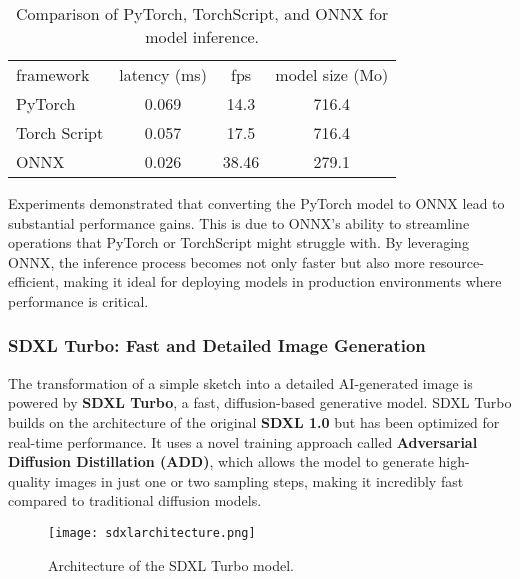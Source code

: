 \begin{table}[h]
    \footnotesize%
    \begin{center}
      \begin{tabular}{lccc}
        \toprule
        framework    & latency (ms) & fps   & model size (Mo) \\
        PyTorch      & 0.069        & 14.3  & 716.4           \\
        Torch Script & 0.057        & 17.5  & 716.4           \\
        ONNX         & 0.026        & 38.46 & 279.1           \\
        \bottomrule
      \end{tabular}
    \end{center}
    \caption{Comparison of PyTorch, TorchScript, and ONNX for model inference.}
    \label{tab:frameworks}
  \end{table}


Experiments demonstrated that converting the PyTorch model to ONNX lead to substantial performance gains.
This is due to ONNX's ability to streamline operations that PyTorch or TorchScript might struggle with.
By leveraging ONNX, the inference process becomes not only faster but also more resource-efficient, making it ideal for deploying models in production environments where performance is critical.

\subsubsection{ SDXL Turbo: Fast and Detailed Image Generation}

The transformation of a simple sketch into a detailed AI-generated image is powered by \textbf{SDXL Turbo}, a fast, diffusion-based generative model.
SDXL Turbo builds on the architecture of the original \textbf{SDXL 1.0} but has been optimized for real-time performance.
It uses a novel training approach called \textbf{Adversarial Diffusion Distillation (ADD)}, which allows the model to generate high-quality images in just one or two sampling steps, making it incredibly fast compared to traditional diffusion models.

\begin{figure}[h]
    \centering
    \texttt{[image: sdxlarchitecture.png]}
    \caption{Architecture of the SDXL Turbo model.}
    \vspace{0.1cm}
    \label{fig:sdxlarchitecture}
\end{figure}

